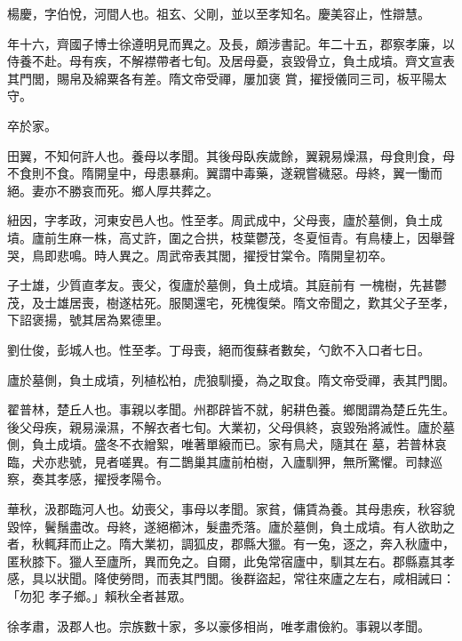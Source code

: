 \begin{pinyinscope}
 楊慶，字伯悅，河間人也。祖玄、父剛，並以至孝知名。慶美容止，性辯慧。



 年十六，齊國子博士徐遵明見而異之。及長，頗涉書記。年二十五，郡察孝廉，以侍養不赴。母有疾，不解襟帶者七旬。及居母憂，哀毀骨立，負土成墳。齊文宣表其門閭，賜帛及綿粟各有差。隋文帝受禪，屢加褒
 賞，擢授儀同三司，板平陽太守。



 卒於家。



 田翼，不知何許人也。養母以孝聞。其後母臥疾歲餘，翼親易燥濕，母食則食，母不食則不食。隋開皇中，母患暴痢。翼謂中毒藥，遂親嘗穢惡。母終，翼一慟而絕。妻亦不勝哀而死。鄉人厚共葬之。



 紐因，字孝政，河東安邑人也。性至孝。周武成中，父母喪，廬於墓側，負土成墳。廬前生麻一株，高丈許，圍之合拱，枝葉鬱茂，冬夏恒青。有鳥棲上，因舉聲哭，鳥即悲鳴。時人異之。周武帝表其閭，擢授甘棠令。隋開皇初卒。



 子士雄，少質直孝友。喪父，復廬於墓側，負土成墳。其庭前有
 一槐樹，先甚鬱茂，及士雄居喪，樹遂枯死。服闋還宅，死槐復榮。隋文帝聞之，歎其父子至孝，下詔褒揚，號其居為累德里。



 劉仕俊，彭城人也。性至孝。丁母喪，絕而復蘇者數矣，勺飲不入口者七日。



 廬於墓側，負土成墳，列植松柏，虎狼馴擾，為之取食。隋文帝受禪，表其門閭。



 翟普林，楚丘人也。事親以孝聞。州郡辟皆不就，躬耕色養。鄉閭謂為楚丘先生。後父母疾，親易澡濕，不解衣者七旬。大業初，父母俱終，哀毀殆將滅性。廬於墓側，負土成墳。盛冬不衣繒絮，唯著單縗而已。家有鳥犬，隨其在
 墓，若普林哀臨，犬亦悲號，見者嗟異。有二鵲巢其廬前柏樹，入廬馴狎，無所驚懼。司隸巡察，奏其孝感，擢授孝陽令。



 華秋，汲郡臨河人也。幼喪父，事母以孝聞。家貧，傭賃為養。其母患疾，秋容貌毀悴，鬢鬚盡改。母終，遂絕櫛沐，髮盡禿落。廬於墓側，負土成墳。有人欲助之者，秋輒拜而止之。隋大業初，調狐皮，郡縣大獵。有一兔，逐之，奔入秋廬中，匿秋膝下。獵人至廬所，異而免之。自爾，此兔常宿廬中，馴其左右。郡縣嘉其孝感，具以狀聞。降使勞問，而表其門閭。後群盜起，常往來廬之左右，咸相誡曰：「勿犯
 孝子鄉。」賴秋全者甚眾。



 徐孝肅，汲郡人也。宗族數十家，多以豪侈相尚，唯孝肅儉約。事親以孝聞。




\end{pinyinscope}
